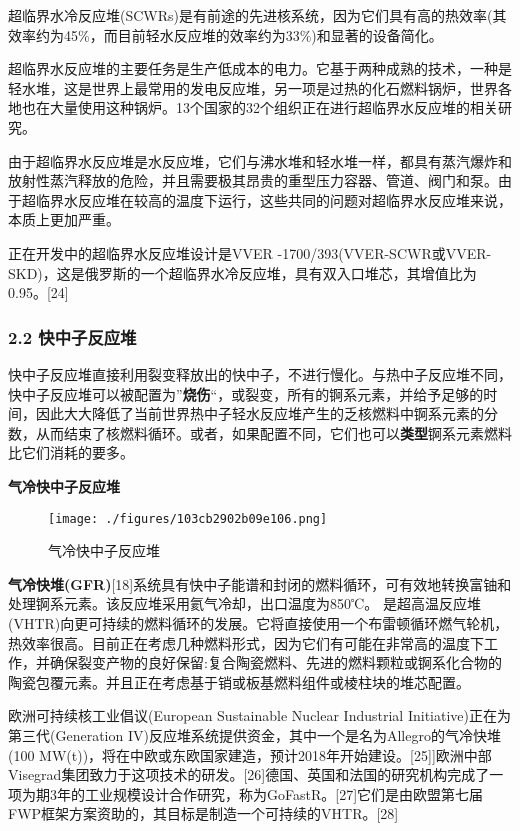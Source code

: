 超临界水冷反应堆(SCWRs)是有前途的先进核系统，因为它们具有高的热效率(其效率约为45\%，而目前轻水反应堆的效率约为33\%)和显著的设备简化。

超临界水反应堆的主要任务是生产低成本的电力。它基于两种成熟的技术，一种是轻水堆，这是世界上最常用的发电反应堆，另一项是过热的化石燃料锅炉，世界各地也在大量使用这种锅炉。13个国家的32个组织正在进行超临界水反应堆的相关研究。

由于超临界水反应堆是水反应堆，它们与沸水堆和轻水堆一样，都具有蒸汽爆炸和放射性蒸汽释放的危险，并且需要极其昂贵的重型压力容器、管道、阀门和泵。由于超临界水反应堆在较高的温度下运行，这些共同的问题对超临界水反应堆来说，本质上更加严重。

正在开发中的超临界水反应堆设计是VVER -1700/393(VVER-SCWR或VVER-SKD)，这是俄罗斯的一个超临界水冷反应堆，具有双入口堆芯，其增值比为0.95。[24]

\subsubsection{2.2 快中子反应堆}
快中子反应堆直接利用裂变释放出的快中子，不进行慢化。与热中子反应堆不同，快中子反应堆可以被配置为”\textbf{烧伤}“，或裂变，所有的锕系元素，并给予足够的时间，因此大大降低了当前世界热中子轻水反应堆产生的乏核燃料中锕系元素的分数，从而结束了核燃料循环。或者，如果配置不同，它们也可以\textbf{类型}锕系元素燃料比它们消耗的要多。

\textbf{气冷快中子反应堆}

\begin{figure}[ht]
\centering
\texttt{[image: ./figures/103cb2902b09e106.png]}
\caption{气冷快中子反应堆} \label{fig_FYD_4}
\end{figure}

\textbf{气冷快堆(GFR)}[18]系统具有快中子能谱和封闭的燃料循环，可有效地转换富铀和处理锕系元素。该反应堆采用氦气冷却，出口温度为850℃。 是超高温反应堆(VHTR)向更可持续的燃料循环的发展。它将直接使用一个布雷顿循环燃气轮机，热效率很高。目前正在考虑几种燃料形式，因为它们有可能在非常高的温度下工作，并确保裂变产物的良好保留:复合陶瓷燃料、先进的燃料颗粒或锕系化合物的陶瓷包覆元素。并且正在考虑基于销或板基燃料组件或棱柱块的堆芯配置。

欧洲可持续核工业倡议(European Sustainable Nuclear Industrial Initiative)正在为第三代(Generation IV)反应堆系统提供资金，其中一个是名为Allegro的气冷快堆(100 MW(t))，将在中欧或东欧国家建造，预计2018年开始建设。[25]]欧洲中部Visegrad集团致力于这项技术的研发。[26]德国、英国和法国的研究机构完成了一项为期3年的工业规模设计合作研究，称为GoFastR。[27]它们是由欧盟第七届FWP框架方案资助的，其目标是制造一个可持续的VHTR。[28]

